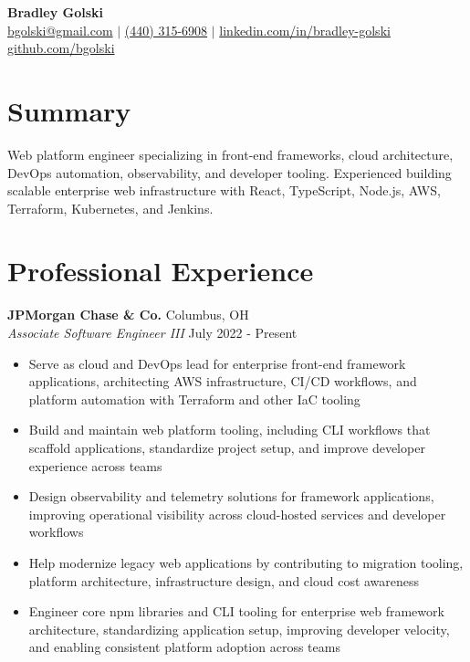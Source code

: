 \documentclass[11pt,a4paper]{article}
\newcommand{\sectionspace}{\vspace{0.8mm}}
\begin{document}
{
\noindent{}\par\vspace{-0.05in}
\begin{center}
	{\Huge \textbf{Bradley Golski}}\\[3pt]
	{\small \href{mailto:bgolski@gmail.com}{bgolski@gmail.com} $|$
	\href{tel:+4403156908}{(440) 315-6908} $|$
	\href{https://linkedin.com/in/bradley-golski}{linkedin.com/in/bradley-golski}}\\[1pt]
	{\small \href{https://github.com/bgolski}{github.com/bgolski}}
\end{center}\vspace{-0.08in}
\par}

\section{Summary}
\sectionspace
Web platform engineer specializing in front-end frameworks, cloud architecture, DevOps automation, observability, and developer tooling. Experienced building scalable enterprise web infrastructure with React, TypeScript, Node.js, AWS, Terraform, Kubernetes, and Jenkins.

\section{Professional Experience}
\sectionspace
\textbf{JPMorgan Chase \& Co.} \hfill Columbus, OH\\
\textit{Associate Software Engineer III} \hfill July 2022 - Present
\begin{itemize}
	\item Serve as cloud and DevOps lead for enterprise front-end framework applications, architecting AWS infrastructure, CI/CD workflows, and platform automation with Terraform and other IaC tooling
	\item Build and maintain web platform tooling, including CLI workflows that scaffold applications, standardize project setup, and improve developer experience across teams
	\item Design observability and telemetry solutions for framework applications, improving operational visibility across cloud-hosted services and developer workflows
	\item Help modernize legacy web applications by contributing to migration tooling, platform architecture, infrastructure design, and cloud cost awareness
	\item Engineer core npm libraries and CLI tooling for enterprise web framework architecture, standardizing application setup, improving developer velocity, and enabling consistent platform adoption across teams
\end{itemize}
\end{document}
